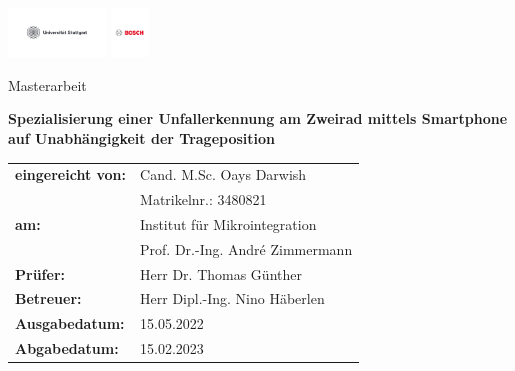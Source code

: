 \relax
\begin{center}
	\begin{center}
			\includegraphics[height=1.3cm]{Bilder/Logos/unistuttgart_logo_deutsch2.pdf} \hfill \includegraphics[height=1.3cm]{Bilder/Logos/BoschLogotype2.pdf}
	\end{center}
	\vspace*{2.5cm} 
		
	\begin{center}
		\LARGE{Masterarbeit}
	\end{center}
	\vspace{0.5cm}
	\begin{center}
		\LARGE\textbf{Spezialisierung einer Unfallerkennung am Zweirad mittels Smartphone auf Unabhängigkeit der Trageposition}
	\end{center}
	\vspace{2cm}
	\begin{center}
		\begin{tabular}{ll}
			\textbf{eingereicht von:}& Cand. M.Sc. Oays Darwish\\
			& Matrikelnr.: 3480821\\[+2.5em]
			\textbf{am:} & Institut für Mikrointegration \\
			& Prof. Dr.-Ing. André Zimmermann \\[+13em]
			\textbf{Prüfer:} & Herr Dr. Thomas Günther\\
			\textbf{Betreuer:} & Herr Dipl.-Ing. Nino Häberlen \\[+2.5em]
			\textbf{Ausgabedatum:} & 15.05.2022\\
			\textbf{Abgabedatum:} & 15.02.2023\\
		\end{tabular}
	\end{center}	
%		

\end{center}
